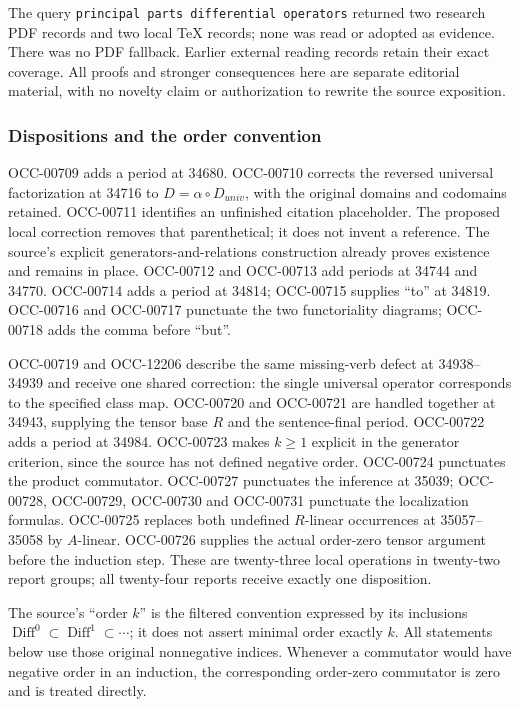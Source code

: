 The query \texttt{principal\ parts\ differential\ operators} returned two research PDF records and two local TeX records; none was read or adopted as evidence. There was no PDF fallback. Earlier external reading records retain their exact coverage. All proofs and stronger consequences here are separate editorial material, with no novelty claim or authorization to rewrite the source exposition.

\subsubsection{Dispositions and the order convention}\label{algebra-proof-043-dispositions-and-the-order-convention}

OCC-00709 adds a period at 34680. OCC-00710 corrects the reversed universal factorization at 34716 to \(D=\alpha\circ D_{univ}\), with the original domains and codomains retained. OCC-00711 identifies an unfinished citation placeholder. The proposed local correction removes that parenthetical; it does not invent a reference. The source's explicit generators-and-relations construction already proves existence and remains in place. OCC-00712 and OCC-00713 add periods at 34744 and 34770. OCC-00714 adds a period at 34814; OCC-00715 supplies ``to'' at 34819. OCC-00716 and OCC-00717 punctuate the two functoriality diagrams; OCC-00718 adds the comma before ``but''.

OCC-00719 and OCC-12206 describe the same missing-verb defect at 34938--34939 and receive one shared correction: the single universal operator corresponds to the specified class map. OCC-00720 and OCC-00721 are handled together at 34943, supplying the tensor base \(R\) and the sentence-final period. OCC-00722 adds a period at 34984. OCC-00723 makes \(k\ge1\) explicit in the generator criterion, since the source has not defined negative order. OCC-00724 punctuates the product commutator. OCC-00727 punctuates the inference at 35039; OCC-00728, OCC-00729, OCC-00730 and OCC-00731 punctuate the localization formulas. OCC-00725 replaces both undefined \(R\)-linear occurrences at 35057--35058 by \(A\)-linear. OCC-00726 supplies the actual order-zero tensor argument before the induction step. These are twenty-three local operations in twenty-two report groups; all twenty-four reports receive exactly one disposition.

The source's ``order \(k\)'' is the filtered convention expressed by its inclusions \(\operatorname{Diff}^0\subset\operatorname{Diff}^1\subset\cdots\); it does not assert minimal order exactly \(k\). All statements below use those original nonnegative indices. Whenever a commutator would have negative order in an induction, the corresponding order-zero commutator is zero and is treated directly.

